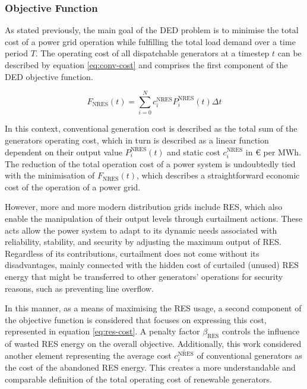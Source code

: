 \subsubsection{Objective Function} \label{sec:objective-func}

As stated previously, the main goal of the \ac{DED} problem is to minimise the total cost of a power grid operation while fulfilling the total load demand over a time period $T$. The operating cost of all dispatchable generators at a timestep $t$ can be described by equation \ref{eq:conv-cost} and comprises the first component of the \ac{DED} objective function. \par

\begin{equation} \label{eq:conv-cost}
	F_\text{NRES}(t) = \sum^N_{i=0} c^\text{NRES}_i P^\text{NRES}_i(t) \Delta t
\end{equation}

In this context, conventional generation cost is described as the total sum of the generators operating cost, which in turn is described as a linear function dependent on their output value $P^\text{NRES}_i(t)$ and static cost $c^\text{NRES}_i$ in € per MWh. The reduction of the total operation cost of a power system is undoubtedly tied with the minimisation of $F_\text{NRES}(t)$, which describes a straightforward economic cost of the operation of a power grid. \par

However, more and more modern distribution grids include \acf{RES}, which also enable the manipulation of their output levels through curtailment actions. These acts allow the power system to adapt to its dynamic needs associated with reliability, stability, and security by adjusting the maximum output of \ac{RES}. Regardless of its contributions, curtailment does not come without its disadvantages, mainly connected with the hidden cost of curtailed (unused) \ac{RES} energy that might be transferred to other generators' operations for security reasons, such as preventing line overflow. \par

In this manner, as a means of maximising the \ac{RES} usage, a second component of the objective function is considered that focuses on expressing this cost, represented in equation \ref{eq:res-cost}. A penalty factor $\beta_\text{RES}$ controls the influence of wasted \ac{RES} energy on the overall objective. Additionally, this work considered another element representing the average cost $\overline{c^\text{NRES}_i}$ of conventional generators as the cost of the abandoned \ac{RES} energy. This creates a more understandable and comparable definition of the total operating cost of renewable generators.  \par

